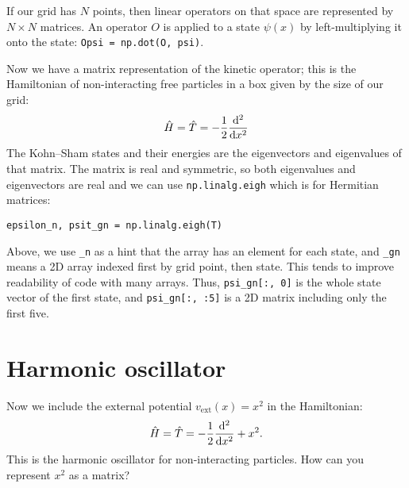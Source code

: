 \documentclass{article}
\begin{document}
If our grid has $N$ points, then linear operators on that
space are represented by $N\times N$ matrices.  An operator $O$ is
applied to a state $\psi(x)$ by left-multiplying it onto the state:
\texttt{Opsi = np.dot(O, psi)}.


\noindent Now we have a matrix representation of the kinetic operator; this
is the Hamiltonian of non-interacting free particles in a box given by
the size of our grid:
\begin{align}
  \hat H = \hat T = -\frac12 \frac{\mathrm d ^2}{\mathrm d x^2}
\end{align}
The Kohn--Sham states and their energies are the eigenvectors and
eigenvalues of that matrix.  The matrix is real and symmetric, so both eigenvalues and eigenvectors are real and we can use
\texttt{np.linalg.eigh} which is for Hermitian matrices:
\begin{lstlisting}
epsilon_n, psit_gn = np.linalg.eigh(T)
\end{lstlisting}
Above, we use \lstinline{_n} as a hint that the array has an element for each
state,
and \lstinline{_gn} means a 2D array indexed first by grid point, then state.
This tends to improve readability of code with many arrays.
Thus, \lstinline{psi_gn[:, 0]} is the whole state vector of the first state,
and \lstinline{psi_gn[:, :5]} is a 2D matrix including only the first five.


\section*{Harmonic oscillator}
Now we include the external potential $v_{\mathrm{ext}}(x) = x^2$ in the Hamiltonian:
\begin{align}
  \hat H = \hat T = -\frac12 \frac{\mathrm d ^2}{\mathrm d x^2} + x^2.
\end{align}
This is the harmonic oscillator for non-interacting particles.
How can you represent $x^2$ as a matrix?
\end{document}
